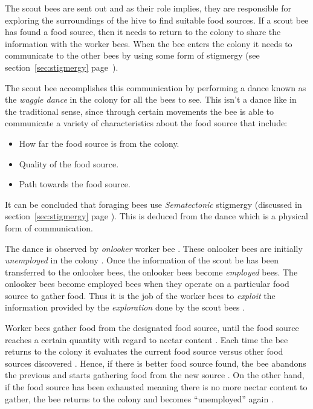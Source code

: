 The scout bees are sent out and as their role implies, they are responsible for exploring the surroundings of the hive to find suitable food sources\cite{ABCCompareStudy}. If a scout bee has found a food source, then it needs to return to the colony to share the information with the worker bees\cite{ABCCompareStudy}. When the bee enters the colony it needs to communicate to the other bees by using some form of stigmergy (see section~\ref{sec:stigmergy} page~\pageref{sec:stigmergy})\cite{ABCCompareStudy}.

The scout bee accomplishes this communication by performing a dance known as the \emph{waggle dance} in the colony for all the bees to see\cite{ABCCompareStudy}. This isn't a dance like in the traditional sense, since through certain movements the bee is able to communicate a variety of characteristics about the food source that include\cite{ABCCompareStudy}:
\begin{itemize}
\item How far the food source is from the colony.
\item Quality of the food source.
\item Path towards the food source.
\end{itemize}

It can be concluded that foraging bees use \emph{Sematectonic} stigmergy (discussed in section~\ref{sec:stigmergy} page \pageref{def:sematectonic}). This is deduced from the dance which is a physical form of communication.

The dance is observed by \emph{onlooker} worker bee \cite{ABCCompareStudy,ABCImageEnhancement}. These onlooker bees are initially \emph{unemployed} in the colony \cite{ABCCompareStudy,ABCImageEnhancement}. Once the information of the scout be has been transferred to the onlooker bees, the onlooker bees become \emph{employed} bees\cite{ABCCompareStudy,ABCImageEnhancement}. The onlooker bees become employed bees when they operate on a particular food source to gather food\cite{ABCCompareStudy,ABCImageEnhancement}. Thus it is the job of the worker bees to \emph{exploit} the information provided by the \emph{exploration} done by the scout bees \cite{ABCCompareStudy,ABCNumericalOptimization}. 

Worker bees gather food from the designated food source, until the food source reaches a certain quantity with regard to nectar content \cite{ABCCompareStudy,ABCNumericalOptimization}. Each time the bee returns to the colony it evaluates the current food source versus other food sources discovered \cite{ABCCompareStudy,ABCNumericalOptimization}. Hence, if there is better food source found, the bee abandons the previous and starts gathering food from the new source \cite{ABCCompareStudy,ABCNumericalOptimization}. On the other hand, if the food source has been exhausted meaning there is no more nectar content to gather, the bee returns to the colony and becomes ``unemployed'' again \cite{ABCCompareStudy,ABCNumericalOptimization}.

